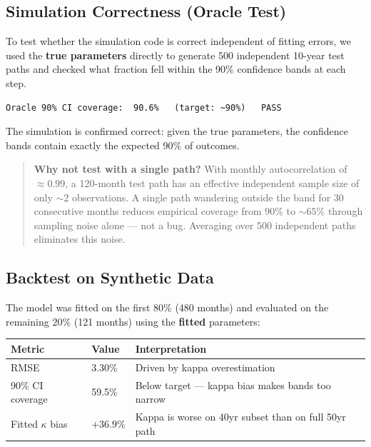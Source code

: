 \documentclass[11pt, letterpaper]{article}
\begin{document}
\subsection{Simulation Correctness (Oracle Test)}

To test whether the simulation code is correct independent of fitting errors,
we used the \textbf{true parameters} directly to generate 500 independent
10-year test paths and checked what fraction fell within the 90\% confidence
bands at each step.

\begin{Verbatim}[frame=single, fontsize=\small]
Oracle 90% CI coverage:  90.6%   (target: ~90%)   PASS
\end{Verbatim}

The simulation is confirmed correct: given the true parameters, the confidence
bands contain exactly the expected 90\% of outcomes.

\begin{quote}
  \textbf{Why not test with a single path?}
  With monthly autocorrelation of $\approx 0.99$, a 120-month test path has an
  effective independent sample size of only $\sim 2$ observations. A single
  path wandering outside the band for 30 consecutive months reduces empirical
  coverage from 90\% to $\sim 65\%$ through sampling noise alone --- not a bug.
  Averaging over 500 independent paths eliminates this noise.
\end{quote}

\subsection{Backtest on Synthetic Data}

The model was fitted on the first 80\% (480 months) and evaluated on the
remaining 20\% (121 months) using the \textbf{fitted} parameters:

\begin{center}
\begin{tabular}{@{}L{5.5cm}R{2.5cm}L{6cm}@{}}
  \toprule
  \textbf{Metric} & \textbf{Value} & \textbf{Interpretation} \\
  \midrule
  RMSE & 3.30\% & Driven by kappa overestimation \\
  90\% CI coverage & 59.5\% & Below target --- kappa bias makes bands too narrow \\
  Fitted $\kappa$ bias & $+36.9\%$ & Kappa is worse on 40yr subset than on full 50yr path \\
  \bottomrule
\end{tabular}
\end{center}
\end{document}
